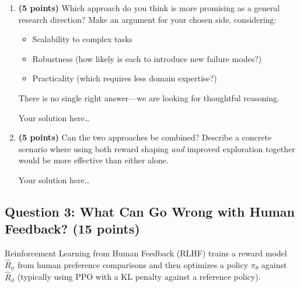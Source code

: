 \documentclass[11pt]{article}
\begin{document}
\begin{enumerate}[label=(\alph*)]
\item \textbf{(5 points)} Which approach do you think is more promising
as a general research direction?  Make an argument for your chosen side,
considering:
\begin{itemize}
  \item Scalability to complex tasks
  \item Robustness (how likely is each to introduce new failure modes?)
  \item Practicality (which requires less domain expertise?)
\end{itemize}
There is no single right answer---we are looking for thoughtful reasoning.

\begin{solution}
Your solution here\ldots
\end{solution}

\item \textbf{(5 points)} Can the two approaches be combined?  Describe
a concrete scenario where using both reward shaping \emph{and} improved
exploration together would be more effective than either alone.

\begin{solution}
Your solution here\ldots
\end{solution}
\end{enumerate}


\subsection*{Question 3: What Can Go Wrong with Human Feedback?
(15 points)}

Reinforcement Learning from Human Feedback (RLHF) trains a reward model
$\hat{R}_\phi$ from human preference comparisons and then optimizes a
policy $\pi_\theta$ against $\hat{R}_\phi$ (typically using PPO with a KL
penalty against a reference policy).
\end{document}
